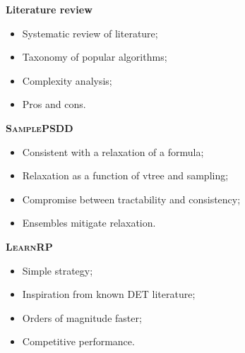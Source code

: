 \documentclass[14pt]{ffslides}
\begin{document}
\begin{minipage}{0.35\textwidth}
  \vspace{1.5cm}
  \large
  {\Large\textbf{Literature review}}
  \begin{itemize}
    \item Systematic review of literature;
    \item Taxonomy of popular algorithms;
    \item Complexity analysis;
    \item Pros and cons.
  \end{itemize}
  \vskip 0.5cm

  {\Large\textbf{\textsc{SamplePSDD}}}
  \begin{itemize}
    \item Consistent with a relaxation of a formula;
    \item Relaxation as a function of vtree and sampling;
    \item Compromise between tractability and consistency;
    \item Ensembles mitigate relaxation.
  \end{itemize}
  \vskip 0.5cm

  {\Large\textbf{\textsc{LearnRP}}}
  \begin{itemize}
    \item Simple strategy;
    \item Inspiration from known DET literature;
    \item Orders of magnitude faster;
    \item Competitive performance.
  \end{itemize}
\end{minipage}
\end{document}

